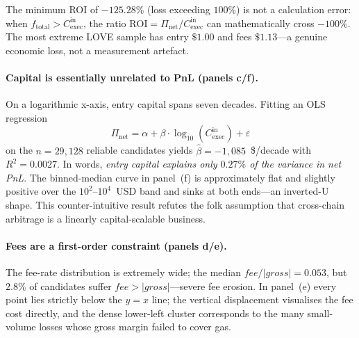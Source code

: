 \documentclass[sigconf,nonacm,10pt]{acmart}
\newcommand{\Cexec}{C_{\text{exec}}}
\newcommand{\Pnet}{\Pi_{\text{net}}}
\begin{document}
The minimum ROI of $-125.28\%$ (loss exceeding $100\%$) is not a
calculation error: when $f_{\text{total}}>\Cexec^{\text{in}}$, the
ratio $\text{ROI}=\Pnet/\Cexec^{\text{in}}$ can mathematically cross
$-100\%$. The most extreme LOVE sample has entry $\$1.00$ and fees
$\$1.13$---a genuine economic loss, not a measurement artefact.

\paragraph{Capital is essentially unrelated to PnL (panels c/f).} On
a logarithmic x-axis, entry capital spans seven decades. Fitting an
OLS regression
\begin{equation}
  \Pnet = \alpha + \beta\cdot\log_{10}(\Cexec^{\text{in}}) + \varepsilon
  \label{eq:ols}
\end{equation}
on the $n=29{,}128$ reliable candidates yields
$\hat\beta=-1{,}085$~\$/decade with $R^2=0.0027$.
In words, \emph{entry capital explains only $0.27\%$ of the variance
in net PnL}. The binned-median curve in panel~(f) is approximately
flat and slightly positive over the $10^{2}$--$10^{4}$~USD band and
sinks at both ends---an inverted-U shape. This counter-intuitive
result refutes the folk assumption that cross-chain arbitrage is a
linearly capital-scalable business.

\paragraph{Fees are a first-order constraint (panels d/e).} The
fee-rate distribution is extremely wide; the median
$\mathit{fee}/|\mathit{gross}|=0.053$, but $2.8\%$ of candidates
suffer $\mathit{fee}>|\mathit{gross}|$---severe fee erosion. In
panel~(e) every point lies strictly below the $y=x$ line; the
vertical displacement visualises the fee cost directly, and the dense
lower-left cluster corresponds to the many small-volume losses whose
gross margin failed to cover gas.
\end{document}
